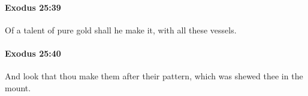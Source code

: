 		\paragraph{Exodus 25:39} %
			\label{EXODUS-25-39}

			Of a talent of pure gold shall he make it, with all these vessels.


		\paragraph{Exodus 25:40} %
			\label{EXODUS-25-40}

			And look that thou make them after their pattern, which was shewed thee in the mount.

